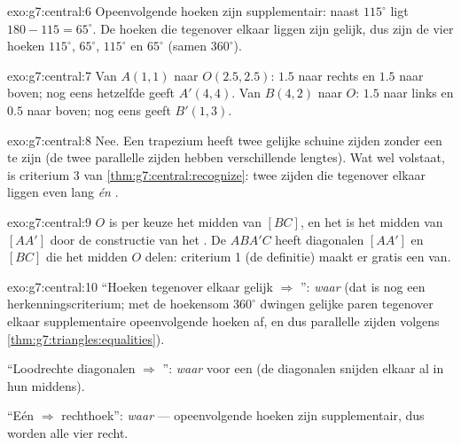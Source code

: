 \begin{solution}{exo:g7:central:6}
Opeenvolgende hoeken zijn supplementair: naast $115^\circ$ ligt
$180 - 115 = 65^\circ$. De hoeken die tegenover elkaar liggen zijn gelijk, dus zijn
de vier hoeken $115^\circ$, $65^\circ$, $115^\circ$ en $65^\circ$ (samen
$360^\circ$).
\end{solution}

\begin{solution}{exo:g7:central:7}
Van $A(1,1)$ naar $O(2.5, 2.5)$: $1.5$ naar rechts en $1.5$ naar boven; nog eens
hetzelfde geeft $A'(4, 4)$. Van $B(4,2)$ naar $O$: $1.5$ naar links en $0.5$ naar
boven; nog eens geeft $B'(1, 3)$.
\end{solution}

\begin{solution}{exo:g7:central:8}
Nee. Een  trapezium heeft twee gelijke schuine zijden zonder een
 te zijn (de twee parallelle zijden hebben verschillende lengtes). Wat
wel volstaat, is criterium 3 van \cref{thm:g7:central:recognize}: twee zijden die
tegenover elkaar liggen even lang \emph{én} .
\end{solution}

\begin{solution}{exo:g7:central:9}
$O$ is per keuze het midden van $[BC]$, en het is het midden van $[AA']$ door de
constructie van het . De  $ABA'C$ heeft diagonalen $[AA']$ en
$[BC]$ die het midden $O$ delen: criterium 1 (de definitie) maakt er gratis een
 van.
\end{solution}

\begin{solution}{exo:g7:central:10}
``Hoeken tegenover elkaar gelijk $\Rightarrow$ '': \emph{waar} (dat is
nog een herkenningscriterium; met de hoekensom $360^\circ$ dwingen gelijke paren
tegenover elkaar supplementaire opeenvolgende hoeken af, en dus parallelle zijden
volgens \cref{thm:g7:triangles:equalities}).

``Loodrechte diagonalen $\Rightarrow$ '': \emph{waar} voor een  (de
diagonalen snijden elkaar al in hun middens).

``Eén  $\Rightarrow$ rechthoek'': \emph{waar} --- opeenvolgende hoeken zijn
supplementair, dus worden alle vier recht.
\end{solution}

